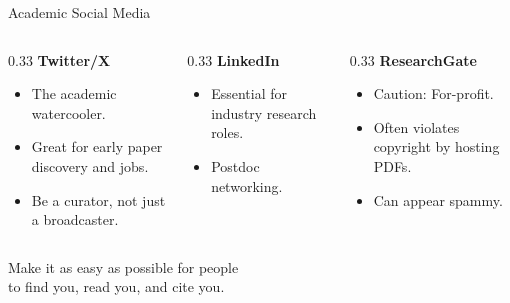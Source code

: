 \documentclass[aspectratio=169]{beamer}
\begin{document}
\begin{frame}{Academic Social Media}
  \begin{columns}[T]
    \begin{column}{0.33\textwidth}
      \textbf{Twitter/X}
      \begin{itemize}
        \item The academic watercooler.
        \item Great for early paper discovery and jobs.
        \item Be a curator, not just a broadcaster.
      \end{itemize}
    \end{column}
    \begin{column}{0.33\textwidth}
      \textbf{LinkedIn}
      \begin{itemize}
        \item Essential for industry research roles.
        \item Postdoc networking.
      \end{itemize}
    \end{column}
    \begin{column}{0.33\textwidth}
      \textbf{ResearchGate}
      \begin{itemize}
        \item Caution: For-profit.
        \item Often violates copyright by hosting PDFs.
        \item Can appear spammy.
      \end{itemize}
    \end{column}
  \end{columns}
\end{frame}

\begin{frame}[standout]
  Make it as easy as possible for people\\
  to find you, read you, and cite you.
\end{frame}
\end{document}
